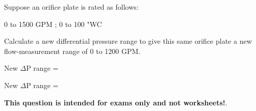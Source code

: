 

Suppose an orifice plate is rated as follows:

\vskip 10pt

\hskip 40pt 0 to 1500 GPM ; 0 to 100 "WC

\vskip 10pt

Calculate a new differential pressure range to give this same orifice plate a new flow-measurement range of 0 to 1200 GPM.

\vskip 10pt

New $\Delta$P range = \underbar{\hskip 50pt}







New $\Delta$P range = 







{\bf This question is intended for exams only and not worksheets!}.



